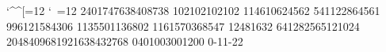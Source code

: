 %
%
%
%
\scrollmode
\catcode`\^^[=12
{\catcode`\ =12\gdef\S{ }}%
\newcount\s \newcount\cur \newcount\nxt \newcount\X \newcount\Y \newcount\R
\newcount\T \newcount\score \newcount\lines \newcount\gover \newcount\started
\newcount\emit
\newcount\px \newcount\py \newcount\pr \newcount\ok \newcount\fm \newcount\fb
\newcount\fx \newcount\fy \newcount\idx \newcount\tmp \newcount\tmpb \newcount\pv
\newcount\src \newcount\dst \newcount\cnt \newcount\jj \newcount\kk \newcount\cl
\newcount\lv \newcount\nx \newcount\ny \newcount\nr \newcount\q \newcount\row
\newcount\hi \newcount\lo
\def\defn#1#2{\expandafter\def\csname#1\endcsname{#2}}
\defn{m0}{240}\defn{m1}{17476}\defn{m2}{3840}\defn{m3}{8738}
\defn{m4}{102}\defn{m5}{102}\defn{m6}{102}\defn{m7}{102}
\defn{m8}{114}\defn{m9}{610}\defn{m10}{624}\defn{m11}{562}
\defn{m12}{54}\defn{m13}{1122}\defn{m14}{864}\defn{m15}{561}
\defn{m16}{99}\defn{m17}{612}\defn{m18}{1584}\defn{m19}{306}
\defn{m20}{113}\defn{m21}{550}\defn{m22}{1136}\defn{m23}{802}
\defn{m24}{116}\defn{m25}{1570}\defn{m26}{368}\defn{m27}{547}
\defn{pw0}{1}\defn{pw1}{2}\defn{pw2}{4}\defn{pw3}{8}\defn{pw4}{16}\defn{pw5}{32}
\defn{pw6}{64}\defn{pw7}{128}\defn{pw8}{256}\defn{pw9}{512}\defn{pw10}{1024}
\defn{pw11}{2048}\defn{pw12}{4096}\defn{pw13}{8192}\defn{pw14}{16384}\defn{pw15}{32768}
\defn{pts0}{0}\defn{pts1}{40}\defn{pts2}{100}\defn{pts3}{300}\defn{pts4}{1200}
\defn{kick0}{0}\defn{kick1}{-1}\defn{kick2}{1}\defn{kick3}{-2}\defn{kick4}{2}
\def\val#1#2{\csname#1\number#2\endcsname}%
\def\setb#1#2{\expandafter\xdef\csname b\number#1\endcsname{\number#2}}
